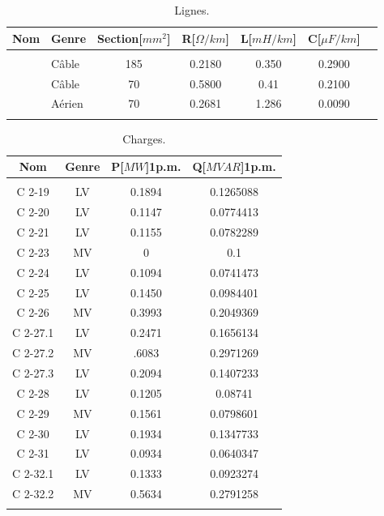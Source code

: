 \vspace{-.5cm}
\begin{table}[H]
	\captionsetup{justification=centering,margin=2cm}
	\caption{Lignes.}
	\label{tab:Lignes}
	\centering
	\begin{tabular}{llccccc}
		\hline
		Nom&Genre&Section[$ mm^2 $]&R[$ \Omega/km $]&L[$ mH/km $]&C[$ \mu F/km $]\\
		\hline\\
		\cablei&Câble&185&0.2180&0.350&0.2900\\
		\cableii&Câble&70&0.5800&0.41&0.2100\\
		\cableiii&Aérien&70&0.2681&1.286&0.0090\\
		\hline\\
	\end{tabular}
\end{table}	
\pagebreak
\begin{table}[H]
	\captionsetup{justification=centering,margin=2cm}
	\caption{Charges.}
	\label{tab:Charges}
	\centering
	\begin{tabular}{cccc}
		\hline
		Nom&Genre&P[$ MW $]1p.m.&Q[$MVAR$]1p.m.\\
		\hline\\
		C 2-19 &LV&0.1894&0.1265088\\
		C 2-20 &LV&0.1147&0.0774413\\
		C 2-21 &LV&0.1155&0.0782289\\
		C 2-23&MV&0&0.1\\
		C 2-24 &LV&0.1094&0.0741473\\
		C 2-25 &LV&0.1450&0.0984401\\
		C 2-26&MV&0.3993&0.2049369\\
		C 2-27.1&LV&0.2471&0.1656134\\
		C 2-27.2& MV&.6083&0.2971269\\
		C 2-27.3& LV&0.2094&0.1407233\\
		C 2-28 &LV&0.1205&0.08741\\
		C 2-29 &MV&0.1561&0.0798601\\
		C 2-30 &LV&0.1934&0.1347733\\
		C 2-31 &LV&0.0934&0.0640347\\
		C 2-32.1 &LV&0.1333&0.0923274\\
		C 2-32.2 &MV&0.5634&0.2791258\\
		\hline\\
	\end{tabular}
\end{table}	


